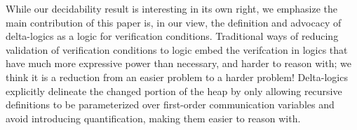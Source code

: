 While our decidability result is interesting in its own right, we emphasize the main contribution of this paper is, in our view, 
the definition and advocacy of delta-logics as a logic for verification conditions. 
Traditional ways of reducing validation of verification conditions to logic embed the verifcation in logics that have much
more expressive power than necessary, and harder to reason with; we think it is a reduction from an easier problem to a harder problem!
Delta-logics explicitly delineate the changed portion of the heap by only allowing recursive definitions to be parameterized over 
first-order communication variables and avoid introducing quantification, making them easier to reason with.

